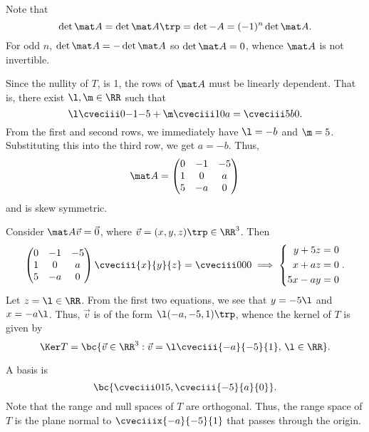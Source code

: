 \begin{solution}
    \begin{ppart}
        Note that \[\det \mat A = \det \mat A \trp = \det{-A} = (-1)^n \det \mat A.\] For odd $n$, $\det \mat A = -\det \mat A$ so $\det \mat A = 0$, whence $\mat A$ is not invertible.
    \end{ppart}
    \begin{ppart}
        \begin{psubpart}
            Since the nullity of $T$, is 1, the rows of $\mat A$ must be linearly dependent. That is, there exist $\l, \m \in \RR$ such that \[\l \cveciii0{-1}{-5} + \m \cveciii10a = \cveciii5b0.\] From the first and second rows, we immediately have $\l = -b$ and $\m = 5$. Substituting this into the third row, we get $a = -b$. Thus, \[\mat A = \begin{pmatrix}0 & -1 & -5 \\ 1 & 0 & a \\ 5 & -a & 0\end{pmatrix}\] and is skew symmetric.
        \end{psubpart}
        \begin{psubpart}
            Consider $\mat A \vec v = \vec 0$, where $\vec v = (x, y, z)\trp \in \RR^3$. Then \[\begin{pmatrix}0 & -1 & -5 \\ 1 & 0 & a \\ 5 & -a & 0\end{pmatrix} \cveciii{x}{y}{z} = \cveciii000 \implies \left\{\begin{aligned}y + 5z = 0 \\ x + az = 0 \\ 5x-ay = 0\end{aligned}\right..\] Let $z = \l \in \RR$. From the first two equations, we see that $y = -5\l$ and $x = -a\l$. Thus, $\vec v$ is of the form $\l (-a, -5, 1)\trp$, whence the kernel of $T$ is given by \[\Ker T = \bc{\vec v \in \RR^3 : \vec v = \l \cveciii{-a}{-5}{1}, \, \l \in \RR}.\]
        \end{psubpart}
        \begin{psubpart}
            A basis is \[\bc{\cveciii015, \cveciii{-5}{a}{0}}.\] Note that the range and null spaces of $T$ are orthogonal. Thus, the range space of $T$ is the plane normal to $\cveciiix{-a}{-5}{1}$ that passes through the origin.
        \end{psubpart}
    \end{ppart}
\end{solution}

